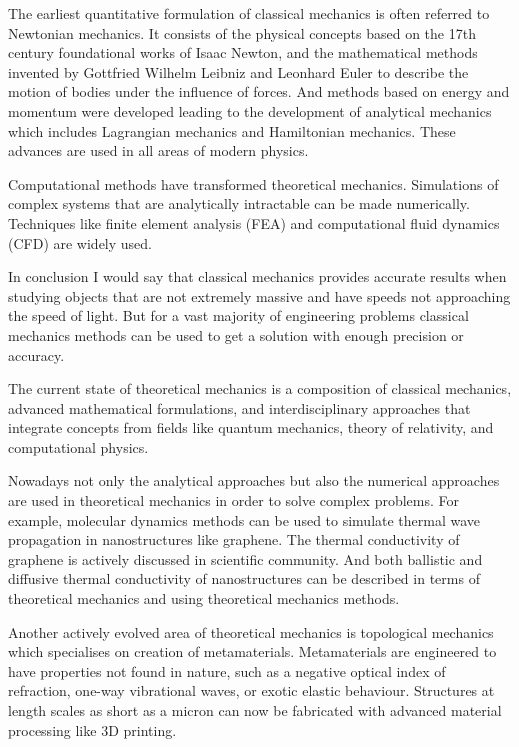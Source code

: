 \documentclass[main.tex]{subfiles}
\begin{document}
The earliest quantitative formulation of classical mechanics is often referred to Newtonian mechanics.
It consists of the physical concepts based on the 17th century foundational works of Isaac Newton,
and the mathematical methods invented by Gottfried Wilhelm Leibniz and Leonhard Euler to describe the motion of bodies under the influence of forces.
And methods based on energy and momentum were developed leading to the development of analytical mechanics which includes Lagrangian mechanics and Hamiltonian mechanics.
These advances are used in all areas of modern physics.

Computational methods have transformed theoretical mechanics.
Simulations of complex systems that are analytically intractable can be made numerically.
Techniques like finite element analysis (FEA) and computational fluid dynamics (CFD) are widely used.

In conclusion I would say that classical mechanics provides accurate results when studying objects that are not extremely massive and have speeds not approaching the speed of light.
But for a vast majority of engineering problems classical mechanics methods can be used to get a solution with enough precision or accuracy.
\\


\newpage

\setcounter{subsection}{7}

The current state of theoretical mechanics is a composition of classical mechanics, advanced mathematical formulations, and interdisciplinary approaches that integrate concepts from fields like quantum mechanics, theory of relativity, and computational physics.

Nowadays not only the analytical approaches but also the numerical approaches are used in theoretical mechanics in order to solve complex problems.
For example, molecular dynamics methods can be used to simulate thermal wave propagation in nanostructures like graphene.
The thermal conductivity of graphene is actively discussed in scientific community.
And both ballistic and diffusive thermal conductivity of nanostructures can be described in terms of theoretical mechanics and using theoretical mechanics methods.

Another actively evolved area of theoretical mechanics is topological mechanics which specialises on creation of metamaterials.
Metamaterials are engineered to have properties not found in nature, such as a negative optical index of refraction, one-way vibrational waves, or exotic elastic behaviour.
Structures at length scales as short as a micron can now be fabricated with advanced material processing like 3D printing.
\end{document}
